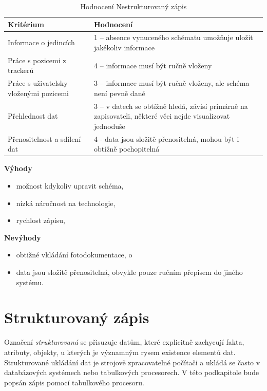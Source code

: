 \begin{table}[h]
	\begin{tabular}{ l | l }
		Kritérium                              & Hodnocení \\
 		\hline			
		Informace o jedincích                  & 1 -- absence vynuceného schématu umožňuje uložit jakékoliv informace          \\
		Práce s pozicemi z trackerů            & 4 -- informace musí být ručně vloženy          \\
		Práce s uživatelsky vloženými pozicemi & 3 -- informace musí být ručně vloženy, ale schéma není pevně dané          \\
		Přehlednost dat                        & 3 -- v datech se obtížně hledá, závisí primárně na zapisovateli, některé věci nejde visualizovat jednoduše          \\
		Přenositelnost a sdílení dat           & 4 - data jsou složitě přenositelná, mohou být i obtížně pochopitelná          \\
		\hline	
	\end{tabular}
	\caption{Hodnocení Nestrukturovaný zápis}
\end{table}

\textbf{Výhody}

\begin{itemize}
	\item možnost kdykoliv upravit schéma,
	\item nízká náročnost na technologie,
	\item rychlost zápisu,
\end{itemize}

\textbf{Nevýhody}

\begin{itemize}
	\item obtižné vkládání fotodokumentace, o
	\item data jsou složitě přenositelná, obvykle pouze ručním přepisem do jiného systému.
\end{itemize}

\section{Strukturovaný zápis}


Označení \emph{strukturovaná} se přisuzuje datům, které explicitně zachycují fakta, atributy, objekty, u kterých je významným rysem existence elementů dat. Strukturované ukládání dat je strojově zpracovatelné počítači a ukládá se často v databázových systémech nebo tabulkových procesorech. V této podkapitole bude popsán zápis pomocí tabulkového procesoru.

